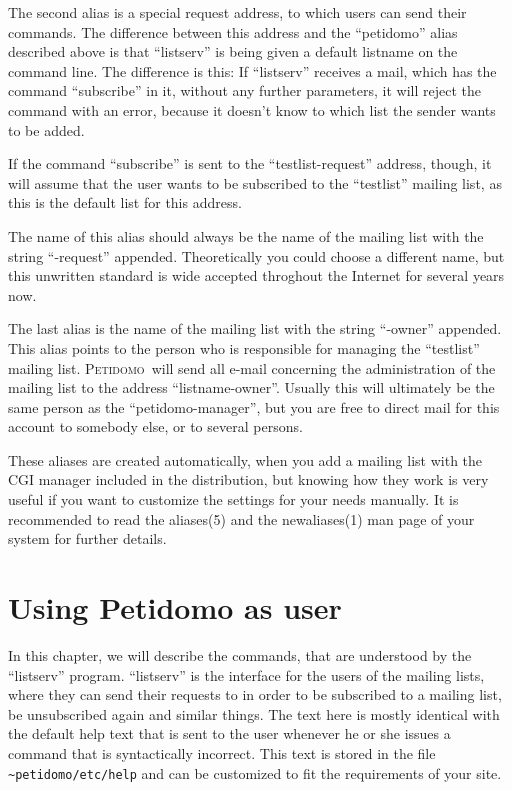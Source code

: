 \documentclass[a4paper]{report}
\newcommand{\Petidomo}{{\scshape Peti\-domo}}
\newcommand{\file}[1]{{\tt #1}}
\newcommand{\Index}[1]{#1\index{#1}}
\begin{document}
The second alias is a special request address, to which users can send
their commands. The difference between this address and the
``petidomo'' alias described above is that ``listserv'' is being given
a default listname on the command line. The difference is this: If
``listserv'' receives a mail, which has the command ``subscribe'' in
it, without any further parameters, it will reject the command with an
error, because it doesn't know to which list the sender wants to be
added.

If the command ``subscribe'' is sent to the ``testlist-request''
address, though, it will assume that the user wants to be subscribed
to the ``testlist'' mailing list, as this is the default list for this
address.

The name of this alias should always be the name of the mailing list
with the string ``-request'' appended. Theoretically you could choose
a different name, but this unwritten standard is wide accepted
throghout the Internet for several years now.

The last alias is the name of the mailing list with the string
``-owner'' appended. This alias points to the person who is
responsible for managing the ``testlist'' mailing list. \Petidomo\
will send all e-mail concerning the administration of the mailing list
to the address ``listname-owner''. Usually this will ultimately be the
same person as the ``petidomo-manager'', but you are free to direct
mail for this account to somebody else, or to several persons.

These aliases are created automatically, when you add a mailing list
with the CGI manager included in the distribution, but knowing how
they work is very useful if you want to customize the settings for
your needs manually. It is recommended to read the aliases(5) and the
newaliases(1) man page of your system for further details.


\chapter{Using Petidomo as user}
\label{petidomo as user}

In this chapter, we will describe the commands, that are
understood by the ``listserv'' program. ``listserv'' is the interface
for the users of the mailing lists, where they can send their requests
to in order to be subscribed to a mailing list, be unsubscribed again
and similar things. The text here is mostly identical with the
\Index{default help text} that is sent to the user
whenever he or she issues a command that is syntactically incorrect.
This text is stored in the file
\file{\~{}petidomo/etc/help} and can be
customized to fit the requirements of your site.
\end{document}
